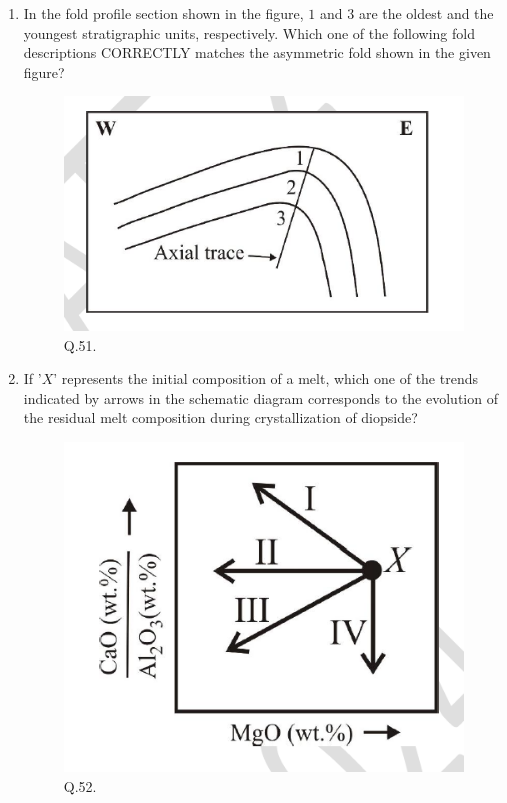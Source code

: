\documentclass[journal,12pt,onecolumn]{IEEEtran}
\theoremstyle{remark}
\begin{document}
\begin{enumerate}
\item In the fold profile section shown in the figure, $1$ and $3$ are the oldest and the youngest stratigraphic units, respectively. Which one of the following fold descriptions CORRECTLY matches the asymmetric fold shown in the given figure?
\begin{figure}[H]
    \centering
    \includegraphics[width=0.5\columnwidth]{Figs/fig_6.png}
    \caption{Q.51.}
    \label{fig:q51}
\end{figure}
\begin{enumerate}
\end{enumerate}
\hfill{}

\item If '$X$' represents the initial composition of a melt, which one of the trends indicated by arrows in the schematic diagram corresponds to the evolution of the residual melt composition during crystallization of diopside?
\begin{figure}[H]
    \centering
    \includegraphics[width=0.5\columnwidth]{Figs/fig_7.png}
    \caption{Q.52.}
    \label{fig:q52}
\end{figure}
\begin{enumerate}
\end{enumerate}
\hfill{}


\end{enumerate}
\end{document}
